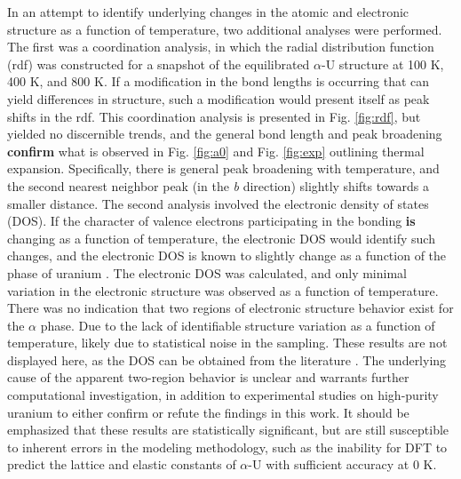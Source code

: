 \documentclass[utf8]{frontiersSCNS} %
\providecommand{\DIFaddtex}[1]{{\bf #1}} %
\providecommand{\DIFdeltex}[1]{} %
\providecommand{\DIFaddbegin}{\protect\color{blue}} %
\providecommand{\DIFaddend}{\protect\color{black}} %
\providecommand{\DIFdelbegin}{\protect\color{red}} %
\providecommand{\DIFdelend}{\protect\color{black}} %
\providecommand{\DIFadd}[1]{\texorpdfstring{\DIFaddtex{#1}}{#1}} %
\providecommand{\DIFdel}[1]{\texorpdfstring{\DIFdeltex{#1}}{}} %
\begin{document}
In an attempt to identify underlying changes in the atomic and electronic structure as a function of temperature, two additional analyses were performed. The first was a coordination analysis, in which the radial distribution function (rdf) was constructed for a snapshot of the equilibrated $\alpha$-U structure at 100 K, 400 K, and 800 K. If a modification in the bond lengths is occurring that can yield differences in structure, such a modification would present itself as peak shifts in the rdf. This coordination analysis is presented in Fig. \ref{fig:rdf}, but yielded no discernible trends, and the general bond length and peak broadening \DIFdelbegin \DIFdel{confirms }\DIFdelend \DIFaddbegin \DIFadd{confirm }\DIFaddend what is observed in Fig. \ref{fig:a0} and Fig. \ref{fig:exp} outlining thermal expansion. Specifically, there is general peak broadening with temperature, and the second nearest neighbor peak (in the \textit{b} direction) slightly shifts towards a smaller distance. The second analysis involved the electronic density of states (DOS). If the character of valence electrons participating in the bonding \DIFdelbegin \DIFdel{are }\DIFdelend \DIFaddbegin \DIFadd{is }\DIFaddend changing as a function of temperature, the electronic DOS would identify such changes, and the electronic DOS is known to slightly change as a function of the phase of uranium \cite{beeler2013}. The electronic DOS was calculated, and only minimal variation in the electronic structure was observed as a function of temperature. There was no indication that two regions of electronic structure behavior exist for the $\alpha$ phase. Due to the lack of identifiable structure variation as a function of temperature, likely due to statistical noise in the sampling. These results are not displayed here, as the DOS can be obtained from the literature \cite{beeler2013,hood2008}. The underlying cause of the apparent two-region behavior is unclear \DIFdelbegin \DIFdel{, }\DIFdelend and warrants further computational investigation, in addition to experimental studies on high-purity uranium to either confirm or refute the findings in this work. It should be emphasized that these results are statistically significant, but are still susceptible to inherent errors in the modeling methodology, such as the inability for DFT to predict the lattice and elastic constants of $\alpha$-U with sufficient accuracy at 0 K. 
\end{document}
